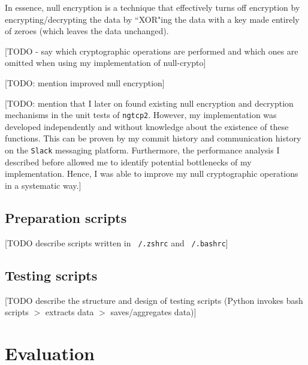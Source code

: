 \documentclass[12pt,a4paper,twoside,openright]{report}
\begin{document}
In essence, null encryption is a technique that effectively turns off encryption by encrypting/decrypting the data by ``XOR"ing the data with a key made entirely of zeroes (which leaves the data unchanged). 

[TODO - say which cryptographic operations are performed and which ones are omitted when using my implementation of null-crypto]


[TODO: mention improved null encryption]

[TODO: mention that I later on found existing null encryption and decryption mechanisms in the unit tests of \texttt{ngtcp2}. 
However, my implementation was developed independently and without knowledge about the existence of these functions.
This can be proven by my commit history and communication history on the \texttt{Slack} messaging platform.
Furthermore, the performance analysis I described before allowed me to identify potential bottlenecks of my implementation.
Hence, I was able to improve my null cryptographic operations in a systematic way.]


\section{Preparation scripts}
[TODO describe scripts written in \texttt{~/.zshrc} and \texttt{~/.bashrc}]


\section{Testing scripts}
[TODO describe the structure and design of testing scripts (Python invokes bash scripts $>$ extracts data $>$ saves/aggregates data)]



\chapter{Evaluation}
\end{document}
